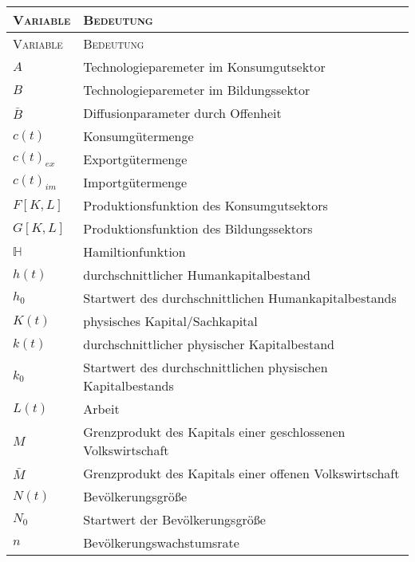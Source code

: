 
\begin{longtable}{|l|l|} %
	\hline
	\textsc{Variable} & \textsc{Bedeutung}\\
	\hline
	\endfirsthead
	
	\hline
	\textsc{Variable} & \textsc{Bedeutung}\\
	\hline
	\endhead
	
	\hline
	\endfoot
	
	\hline
	\endlastfoot
	
		$A$ & Technologieparemeter im Konsumgutsektor\\%
		$B$ & Technologieparemeter im Bildungssektor\\%
		$\bar{B}$ & Diffusionparameter durch Offenheit\\%
		$c(t)$ & Konsumgütermenge\\%
		$c(t)_{ex}$ & Exportgütermenge\\%
		$c(t)_{im}$ & Importgütermenge\\%
		$F[K,L]$ & Produktionsfunktion des Konsumgutsektors\\%
		$G[K,L]$ & Produktionsfunktion des Bildungssektors\\%
		$\mathbb{H}$ & Hamiltionfunktion\\%
		$h(t)$ & durchschnittlicher Humankapitalbestand\\%
		$h_{0}$ & Startwert des durchschnittlichen Humankapitalbestands\\%
		$K(t)$ & physisches Kapital/Sachkapital\\ %
		$k(t)$ & durchschnittlicher physischer Kapitalbestand\\%
		$k_{0}$ & Startwert des durchschnittlichen physischen Kapitalbestands\\%
		$L(t)$ & Arbeit\\%
		$M$ & Grenzprodukt des Kapitals einer geschlossenen Volkswirtschaft\\
	  $\bar{M}$ & Grenzprodukt des Kapitals einer offenen Volkswirtschaft\\%
		$N(t)$ & Bevölkerungsgrö{\ss}e\\%
		$N_0$ & Startwert der Bevölkerungsgrö{\ss}e\\
		$n$ & Bevölkerungswachstumsrate\\%

\end{longtable}
